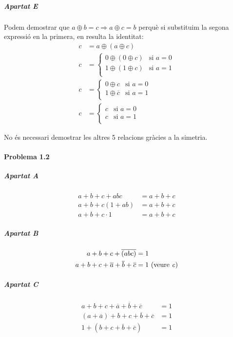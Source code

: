 \subparagraph{Apartat E} Podem demostrar que $a \oplus b = c \Rightarrow a \oplus c = b$ perquè si substituim la segona expressió en la primera, en resulta la identitat:
%
\begin{align*}
  c &= a \oplus \left(a \oplus c\right) \\
  c &= \begin{cases}
    0 \oplus \left(0 \oplus c\right) & \text{si $a = 0$} \\
    1 \oplus \left(1 \oplus c\right) & \text{si $a = 1$} \\
  \end{cases} \\
  c &= \begin{cases}
    0 \oplus c & \text{si $a = 0$} \\
    1 \oplus \overline{c} & \text{si $a = 1$} \\
  \end{cases} \\
  c &= \begin{cases}
    c & \text{si $a = 0$} \\
    c & \text{si $a = 1$} \\
  \end{cases}
\end{align*}

No és necessari demostrar les altres 5 relacions gràcies a la simetria.

\finishpage

\startpage
\paragraph{Problema 1.2}

\subparagraph{Apartat A} \begin{align*}
  a + b + c + abc &= a + b + c \\
  a + b + c\left(1 + ab\right) &= a + b + c \\
  a + b + c \cdot 1 &= a + b + c
\end{align*}

\subparagraph{Apartat B} \begin{align*}
  a + b + c + \overline{\left(abc\right)} &= 1 \\
  a + b + c + \overline{a} + \overline{b} + \overline{c} &= 1 \,\, \text{(veure \emph{c})}
\end{align*}

\subparagraph{Apartat C} \begin{align*}
  a + b + c + \overline{a} + \overline{b} + \overline{c} &= 1 \\
  \left(a + \overline{a}\right) + b + c + \overline{b} + \overline{c} &= 1 \\
  1 + \left(b + c + \overline{b} + \overline{c}\right) &= 1
\end{align*}

